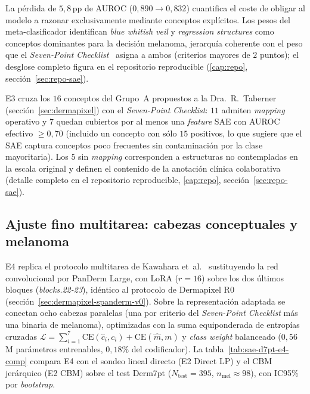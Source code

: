La pérdida de $5{,}8$\,pp de AUROC ($0{,}890 \to 0{,}832$) cuantifica el
coste de obligar al modelo a razonar exclusivamente mediante conceptos
explícitos. Los pesos del meta-clasificador identifican \emph{blue
whitish veil} y \emph{regression structures} como conceptos dominantes
para la decisión melanoma, jerarquía coherente con el peso que el
\emph{Seven-Point Checklist}~\cite{kawahara2019} asigna a ambos
(criterios mayores de $2$ puntos); el desglose completo figura en el
repositorio reproducible (\ref{cap:repo}, sección~\ref{sec:repo-sae}).

E3 cruza los $16$ conceptos del Grupo~A propuestos a la
Dra.~R.~Taberner (sección~\ref{sec:dermapixel}) con el \emph{Seven-Point
Checklist}: $11$ admiten \emph{mapping} operativo y $7$ quedan cubiertos
por al menos una \emph{feature} SAE con AUROC efectivo $\geq 0{,}70$
(incluido un concepto con sólo $15$ positivos, lo que sugiere que el SAE
captura conceptos poco frecuentes sin contaminación por la clase
mayoritaria). Los $5$ sin \emph{mapping} corresponden a estructuras no
contempladas en la escala original y definen el contenido de la
anotación clínica colaborativa (detalle completo en el
repositorio reproducible, \ref{cap:repo}, sección~\ref{sec:repo-sae}).

\subsection*{Ajuste fino multitarea: cabezas conceptuales y
melanoma}
\label{sec:sae-d7pt-e4}

E4 replica el protocolo multitarea de
Kawahara et~al.~\cite{kawahara2019} sustituyendo la red convolucional
por PanDerm Large, con LoRA ($r = 16$) sobre los dos últimos bloques
(\emph{blocks.22-23}), idéntico al protocolo de Dermapixel R0
(sección~\ref{sec:dermapixel-spanderm-v0}). Sobre la representación
adaptada se conectan ocho cabezas paralelas (una por criterio del
\emph{Seven-Point Checklist} más una binaria de melanoma), optimizadas
con la suma equiponderada de entropías cruzadas
$\mathcal{L} = \sum_{i=1}^{7} \mathrm{CE}(\hat{c}_i, c_i) +
\mathrm{CE}(\hat{m}, m)$ y \emph{class weight} balanceado ($0{,}56$\,M
parámetros entrenables, $0{,}18\%$ del codificador). La
tabla~\ref{tab:sae-d7pt-e4-comp} compara E4 con el sondeo lineal
directo (E2 Direct LP) y el CBM jerárquico (E2 CBM) sobre el test
Derm7pt ($N_{\mathrm{test}} = 395$, $n_{\mathrm{mel}} \approx 98$),
con IC95\% por \emph{bootstrap}.

